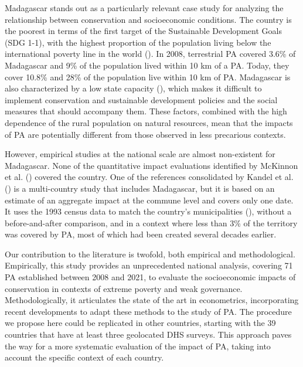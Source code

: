 \documentclass[
]{article}
\begin{document}
Madagascar stands out as a particularly relevant case study for
analyzing the relationship between conservation and socioeconomic
conditions. The country is the poorest in terms of the first target of
the Sustainable Development Goals (SDG 1-1), with the highest proportion
of the population living below the international poverty line in the
world (). In 2008, terrestrial PA covered 3.6\% of Madagascar and 9\%
of the population lived within 10 km of a PA. Today, they cover 10.8\%
and 28\% of the population live within 10 km of PA\footnotemark[8].
Madagascar is also characterized by a low state capacity
(), which
makes it difficult to implement conservation and sustainable development
policies and the social measures that should accompany them. These
factors, combined with the high dependence of the rural population on
natural resources, mean that the impacts of PA are potentially different
from those observed in less precarious contexts.

However, empirical studies at the national scale are almost non-existent
for Madagascar. None of the quantitative impact evaluations identified
by McKinnon et al. () covered the
country. One of the references consolidated by Kandel et al.
() is a multi-country study
that includes Madagascar, but it is based on an estimate of an aggregate
impact at the commune level and covers only one date. It uses the 1993
census data to match the country's municipalities
(), without a
before-and-after comparison, and in a context where less than 3\% of the
territory was covered by PA, most of which had been created several
decades earlier.

Our contribution to the literature is twofold, both empirical and
methodological. Empirically, this study provides an unprecedented
national analysis, covering 71 PA established between 2008 and 2021, to
evaluate the socioeconomic impacts of conservation in contexts of
extreme poverty and weak governance. Methodologically, it articulates
the state of the art in econometrics, incorporating recent developments
to adapt these methods to the study of PA. The procedure we propose here
could be replicated in other countries, starting with the 39 countries
that have at least three geolocated DHS surveys. This approach paves the
way for a more systematic evaluation of the impact of PA, taking into
account the specific context of each country.
\end{document}
